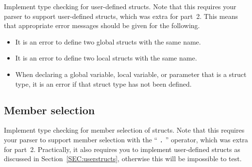 \documentclass{article}
\newcommand{\parser}{2}
\begin{document}
Implement type checking for user-defined structs.
Note that this requires your parser to support user-defined structs,
which was extra for part~\parser.
This means that appropriate error messages should be given for the following.
\begin{itemize}
  \item
  It is an error to define two global structs with the same name.

  \item
  It is an error to define two local structs with the same name.

  \item
  When declaring a global variable, local variable,
  or parameter that is a struct type,
  it is an error if that struct type has not been defined.
\end{itemize}



\subsection{Member selection}
\label{SEC:members}

Implement type checking for member selection of structs.
Note that this requires your parser to support member selection
with the `` {\tt .} '' operator,
which was extra for part~\parser.
Practically, it also requires you to implement user-defined structs
as discussed in Section~\ref{SEC:userstructs},
otherwise this will be impossible to test.
\end{document}
